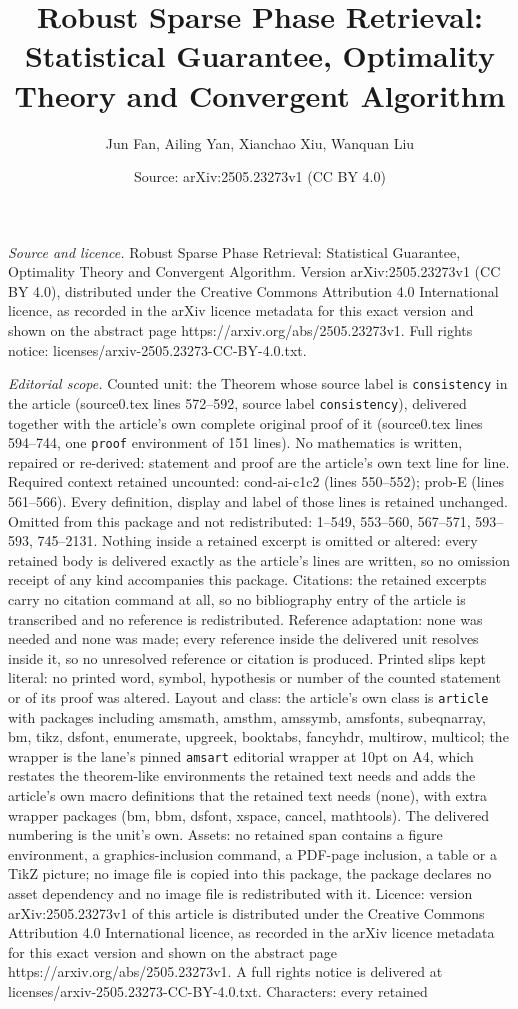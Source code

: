 \documentclass[10pt,a4paper]{amsart}
\title[Robust Sparse Phase Retrieval: Statistical Guarantee, Optima]{Robust Sparse Phase Retrieval: Statistical Guarantee, Optimality Theory and Convergent Algorithm}
\author{Jun Fan, Ailing Yan, Xianchao Xiu, Wanquan Liu}
\date{Source: arXiv:2505.23273v1 (CC BY 4.0)}
\begin{document}
\maketitle

\noindent\emph{Source and licence.} Robust Sparse Phase Retrieval: Statistical Guarantee, Optimality Theory and Convergent Algorithm. Version arXiv:2505.23273v1 (CC BY 4.0), distributed under the Creative Commons Attribution 4.0 International licence, as recorded in the arXiv licence metadata for this exact version and shown on the abstract page https://arxiv.org/abs/2505.23273v1. Full rights notice: licenses/arxiv-2505.23273-CC-BY-4.0.txt.\par\smallskip

\noindent\textit{Editorial scope.} Counted unit: the Theorem whose source label is \texttt{consistency} in the article (source0.tex lines 572--592, source label \texttt{consistency}), delivered together with the article's own complete original proof of it (source0.tex lines 594--744, one \texttt{proof} environment of 151 lines). No mathematics is written, repaired or re-derived: statement and proof are the article's own text line for line. Required context retained uncounted: cond-ai-c1c2 (lines 550--552); prob-E (lines 561--566). Every definition, display and label of those lines is retained unchanged. Omitted from this package and not redistributed: 1--549, 553--560, 567--571, 593--593, 745--2131. Nothing inside a retained excerpt is omitted or altered: every retained body is delivered exactly as the article's lines are written, so no omission receipt of any kind accompanies this package. Citations: the retained excerpts carry no citation command at all, so no bibliography entry of the article is transcribed and no reference is redistributed. Reference adaptation: none was needed and none was made; every reference inside the delivered unit resolves inside it, so no unresolved reference or citation is produced. Printed slips kept literal: no printed word, symbol, hypothesis or number of the counted statement or of its proof was altered. Layout and class: the article's own class is \texttt{article} with packages including amsmath, amsthm, amssymb, amsfonts, subeqnarray, bm, tikz, dsfont, enumerate, upgreek, booktabs, fancyhdr, multirow, multicol; the wrapper is the lane's pinned \texttt{amsart} editorial wrapper at 10pt on A4, which restates the theorem-like environments the retained text needs and adds the article's own macro definitions that the retained text needs (none), with extra wrapper packages (bm, bbm, dsfont, xspace, cancel, mathtools). The delivered numbering is the unit's own. Assets: no retained span contains a figure environment, a graphics-inclusion command, a PDF-page inclusion, a table or a TikZ picture; no image file is copied into this package, the package declares no asset dependency and no image file is redistributed with it. Licence: version arXiv:2505.23273v1 of this article is distributed under the Creative Commons Attribution 4.0 International licence, as recorded in the arXiv licence metadata for this exact version and shown on the abstract page https://arxiv.org/abs/2505.23273v1. A full rights notice is delivered at licenses/arxiv-2505.23273-CC-BY-4.0.txt. Characters: every retained 
\end{document}
